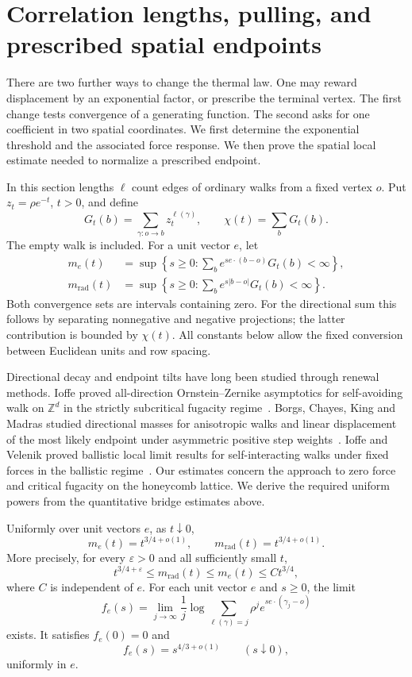 \section{Correlation lengths, pulling, and prescribed spatial endpoints}
\label{R:resp:section}

There are two further ways to change the thermal law. One may reward displacement by an exponential factor, or prescribe the terminal vertex. The first change tests convergence of a generating function. The second asks for one coefficient in two spatial coordinates. We first determine the exponential threshold and the associated force response. We then prove the spatial local estimate needed to normalize a prescribed endpoint.

In this section lengths $\ell$ count edges of ordinary walks from a fixed vertex $o$. Put $z_t=\rho e^{-t}$, $t>0$, and define
\[
 G_t(b)=\sum_{\gamma:o\to b}z_t^{\ell(\gamma)},\qquad
 \chi(t)=\sum_bG_t(b).
\]
The empty walk is included. For a unit vector $e$, let
\begin{align}
 m_e(t)&=\sup\left\{s\ge0:\sum_b e^{s e\cdot(b-o)}G_t(b)<\infty\right\},
 \label{R:resp:directional-mass}\\
 m_{\mathrm{rad}}(t)&=\sup\left\{s\ge0:\sum_b e^{s|b-o|}G_t(b)<\infty\right\}.
 \label{R:resp:radial-mass}
\end{align}
Both convergence sets are intervals containing zero. For the directional sum this follows by separating nonnegative and negative projections; the latter contribution is bounded by $\chi(t)$. All constants below allow the fixed conversion between Euclidean units and row spacing.

Directional decay and endpoint tilts have long been studied through renewal methods. Ioffe proved all-direction Ornstein--Zernike asymptotics for self-avoiding walk on $\mathbb Z^d$ in the strictly subcritical fugacity regime~\cite{Ioffe1998}. Borgs, Chayes, King and Madras studied directional masses for anisotropic walks and linear displacement of the most likely endpoint under asymmetric positive step weights~\cite{BorgsChayesKingMadras2000}. Ioffe and Velenik proved ballistic local limit results for self-interacting walks under fixed forces in the ballistic regime~\cite{IoffeVelenik2008}. Our estimates concern the approach to zero force and critical fugacity on the honeycomb lattice. We derive the required uniform powers from the quantitative bridge estimates above.

\begin{theorem}\label{R:resp:force}
Uniformly over unit vectors $e$, as $t\downarrow0$,
\[
 m_e(t)=t^{3/4+o(1)},\qquad m_{\mathrm{rad}}(t)=t^{3/4+o(1)}.
\]
More precisely, for every $\varepsilon>0$ and all sufficiently small $t$,
\[
 t^{3/4+\varepsilon}\le m_{\mathrm{rad}}(t)\le m_e(t)\le C t^{3/4},
\]
where $C$ is independent of $e$. For each unit vector $e$ and $s\ge0$, the limit
\[
 f_e(s)=\lim_{j\to\infty}\frac1j\log
 \sum_{\ell(\gamma)=j}\rho^j e^{s e\cdot(\gamma_j-o)}
\]
exists. It satisfies $f_e(0)=0$ and
\[
 f_e(s)=s^{4/3+o(1)}\qquad(s\downarrow0),
\]
uniformly in $e$.
\end{theorem}

